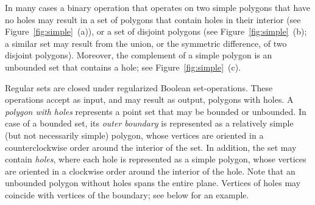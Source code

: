 In many cases a binary operation that operates on two simple
polygons that have no holes may result in a set of polygons that
contain holes in their interior (see Figure~\ref{fig:simple}~(a)), 
or a set of disjoint polygons (see Figure~\ref{fig:simple}~(b); a similar
set may result from the union, or the symmetric difference, of two disjoint
polygons). Moreover, the complement of a simple polygon is an unbounded set
that contains a hole; see Figure~\ref{fig:simple}~(c).

Regular sets are closed under regularized Boolean set-operations.
These operations accept as input, and may result as output, polygons
with holes. 
A {\em polygon with holes} represents a point set that may
be bounded or unbounded. In case of a bounded set, its {\em outer
boundary} is represented as a relatively simple (but not necessarily simple) polygon, whose vertices are oriented in a counterclockwise
order around the interior of the set. In addition, the set may contain
{\em holes}, where each hole is represented as a simple
polygon, whose vertices are oriented in a clockwise order around the
interior of the hole. Note that an unbounded polygon without holes
spans the entire plane. Vertices of holes may coincide with vertices
of the boundary; see below for an example. 


